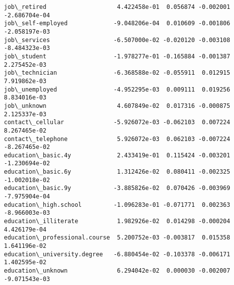 \documentclass[11pt]{article}
\begin{document}
\begin{tcolorbox}[breakable, size=fbox, boxrule=.5pt, pad at break*=1mm, opacityfill=0]
\begin{Verbatim}[commandchars=\\\{\}]
job\_retired                    4.422458e-01  0.056874 -0.002001 -2.686704e-04
job\_self-employed             -9.048206e-04  0.010609 -0.001806 -2.058197e-03
job\_services                  -6.507000e-02 -0.020120 -0.003108 -8.484323e-03
job\_student                   -1.978277e-01 -0.165884 -0.001387  2.275452e-03
job\_technician                -6.368588e-02 -0.055911  0.012915  7.919862e-03
job\_unemployed                -4.952295e-03  0.009111  0.019256  8.834016e-03
job\_unknown                    4.607849e-02  0.017316 -0.000875  2.125337e-03
contact\_cellular              -5.926072e-03 -0.062103  0.007224  8.267465e-02
contact\_telephone              5.926072e-03  0.062103 -0.007224 -8.267465e-02
education\_basic.4y             2.433419e-01  0.115424 -0.003201 -1.230694e-02
education\_basic.6y             1.312426e-02  0.080411 -0.002325 -1.002018e-02
education\_basic.9y            -3.885826e-02  0.070426 -0.003969 -7.975904e-04
education\_high.school         -1.096283e-01 -0.071771  0.002363 -8.966003e-03
education\_illiterate           1.982926e-02  0.014298 -0.000204  4.426179e-04
education\_professional.course  5.200752e-03 -0.003817  0.015358  1.641196e-02
education\_university.degree   -6.880454e-02 -0.103378 -0.006171  1.402595e-02
education\_unknown              6.294042e-02  0.000030 -0.002007 -9.071543e-03


\end{Verbatim}
\end{tcolorbox}
\end{document}
